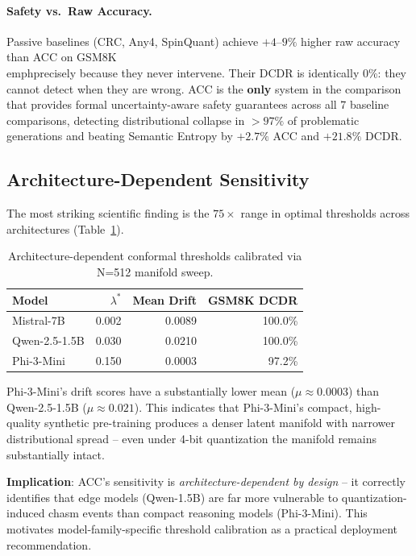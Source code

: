 \documentclass{uai2026}  %
\begin{document}
\paragraph{Safety vs.\ Raw Accuracy.}
Passive baselines (CRC, Any4, SpinQuant) achieve $+4$--$9\%$ higher
raw accuracy than ACC on GSM8K \\emph{precisely because they never intervene}.
Their DCDR is identically 0\%: they cannot detect when they are wrong.
ACC is the \textbf{only} system in the comparison that provides formal
uncertainty-aware safety guarantees across all 7 baseline comparisons,
detecting distributional collapse in $>97\%$ of problematic generations
and beating Semantic Entropy by $+2.7\%$ ACC and $+21.8\%$ DCDR.

\subsection{Architecture-Dependent Sensitivity}
\label{subsec:arch}

The most striking scientific finding is the $75\times$ range in
optimal thresholds across architectures (Table~\ref{tab:thresholds}).

\begin{table}[htbp]
\centering
\caption{Architecture-dependent conformal thresholds calibrated via N=512 manifold sweep.}
\label{tab:thresholds}
\footnotesize
\begin{tabular}{@{}lrrr@{}}
\toprule
\textbf{Model} & $\lambda^*$ & \textbf{Mean Drift} & \textbf{GSM8K DCDR} \\
\midrule
Mistral-7B    & 0.002 & 0.0089 & 100.0\% \\
Qwen-2.5-1.5B & 0.030 & 0.0210 & 100.0\% \\
Phi-3-Mini    & 0.150 & 0.0003 & 97.2\% \\
\bottomrule
\end{tabular}
\end{table}

Phi-3-Mini's drift scores have a substantially lower mean
($\mu \approx 0.0003$) than Qwen-2.5-1.5B ($\mu \approx 0.021$).
This indicates that Phi-3-Mini's compact, high-quality synthetic pre-training
produces a denser latent manifold with narrower distributional spread --
even under 4-bit quantization the manifold remains substantially intact.

\textbf{Implication}: ACC's sensitivity is
\emph{architecture-dependent by design} -- it correctly identifies that
edge models (Qwen-1.5B) are far more vulnerable to quantization-induced
chasm events than compact reasoning models (Phi-3-Mini).
This motivates model-family-specific threshold calibration as a practical
deployment recommendation.
\end{document}
